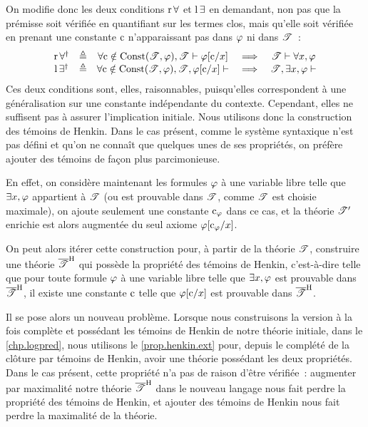 On modifie donc les deux conditions $\operatorname{r}\mathord{\forall}$ et $\operatorname{l}\mathord{\exists}$ en demandant, non pas
que la prémisse soit vérifiée en quantifiant sur les termes clos, mais qu'elle
soit vérifiée en prenant une constante $\mathrm{c}$ n'apparaissant pas dans $\varphi$ ni
dans $\mathscr T$~:
\[\begin{array}{ccccc}
\operatorname{r}\mathord{\forall}^\dagger & \triangleq & \forall \mathrm{c} \notin \operatorname{Const}(\mathscr T, \varphi),
\mathscr T \vdash \varphi[\mathrm{c}/x]
& \implies & \mathscr T \vdash \forall x, \varphi \\
\operatorname{l}\mathord{\exists}^\dagger & \triangleq & \forall \mathrm{c} \notin \operatorname{Const}(\mathscr T, \varphi),
\mathscr T, \varphi[\mathrm{c}/x]\vdash
& \implies & \mathscr T, \exists x, \varphi \vdash
\end{array}\]
Ces deux conditions sont, elles, raisonnables, puisqu'elles correspondent à une
généralisation sur une constante indépendante du contexte. Cependant, elles ne
suffisent pas à assurer l'implication initiale. Nous utilisons donc la
construction des témoins de Henkin. Dans le cas présent, comme le système
syntaxique n'est pas défini et qu'on ne connaît que quelques unes de ses
propriétés, on préfère ajouter des témoins de façon plus parcimonieuse.

En effet, on considère maintenant les formules $\varphi$ à une variable libre
telle que $\exists x, \varphi$ appartient à $\mathscr T$ (ou est prouvable dans
$\mathscr T$, comme $\mathscr T$ est choisie maximale), on ajoute seulement une constante
$\mathrm{c}_{\varphi}$ dans ce cas, et la théorie $\mathscr T'$ enrichie est alors augmentée
du seul axiome $\varphi[\mathrm{c}_{\varphi}/x]$.

On peut alors itérer cette construction pour, à partir de la théorie
$\mathscr T$, construire une théorie $\overline{\mathscr T}^{\mathrm H}$ qui possède la propriété des
témoins de Henkin, c'est-à-dire telle que pour toute formule $\varphi$ à une
variable libre telle que $\exists x, \varphi$ est prouvable dans
$\overline{\mathscr T}^{\mathrm H}$, il existe une constante $\mathrm{c}$ telle que $\varphi[\mathrm{c}/x]$ est
prouvable dans $\overline{\mathscr T}^{\mathrm H}$.

Il se pose alors un nouveau problème. Lorsque nous construisons la version à
la fois complète et possédant les témoins de Henkin de notre théorie initiale,
dans le \cref{chp.logpred}, nous utilisons le \cref{prop.henkin.ext} pour,
depuis le complété de la clôture par témoins de Henkin, avoir une théorie
possédant les deux propriétés. Dans le cas présent, cette propriété n'a pas de
raison d'être vérifiée~: augmenter par maximalité notre théorie $\overline{\mathscr T}^{\mathrm H}$
dans le nouveau langage nous fait perdre la propriété des témoins de Henkin, et
ajouter des témoins de Henkin nous fait perdre la maximalité de la théorie.

